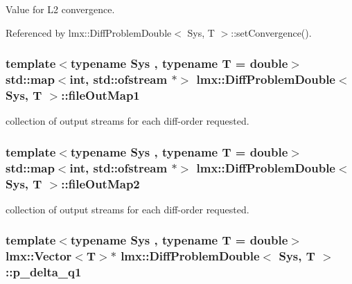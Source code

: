 Value for L2 convergence. 



Referenced by lmx\-::\-Diff\-Problem\-Double$<$ Sys, T $>$\-::set\-Convergence().

\hypertarget{classlmx_1_1DiffProblemDouble_aa26e0b530cc5b78b32383515a7932a97}{
\subsubsection[{file\-Out\-Map1}]{\setlength{\rightskip}{0pt plus 5cm}template$<$typename Sys , typename T  = double$>$ std\-::map$<$int, std\-::ofstream $\ast$$>$ {\bf lmx\-::\-Diff\-Problem\-Double}$<$ Sys, T $>$\-::file\-Out\-Map1\hspace{0.3cm}{\ttfamily [protected]}}}\label{classlmx_1_1DiffProblemDouble_aa26e0b530cc5b78b32383515a7932a97}


collection of output streams for each diff-\/order requested. 

\hypertarget{classlmx_1_1DiffProblemDouble_a17946e26033b4dc383b37756b39097a5}{
\subsubsection[{file\-Out\-Map2}]{\setlength{\rightskip}{0pt plus 5cm}template$<$typename Sys , typename T  = double$>$ std\-::map$<$int, std\-::ofstream $\ast$$>$ {\bf lmx\-::\-Diff\-Problem\-Double}$<$ Sys, T $>$\-::file\-Out\-Map2\hspace{0.3cm}{\ttfamily [protected]}}}\label{classlmx_1_1DiffProblemDouble_a17946e26033b4dc383b37756b39097a5}


collection of output streams for each diff-\/order requested. 

\hypertarget{classlmx_1_1DiffProblemDouble_ad460462bffa8b3425e0e2df46d6bcf63}{
\subsubsection[{p\-\_\-delta\-\_\-q1}]{\setlength{\rightskip}{0pt plus 5cm}template$<$typename Sys , typename T  = double$>$ {\bf lmx\-::\-Vector}$<$T$>$$\ast$ {\bf lmx\-::\-Diff\-Problem\-Double}$<$ Sys, T $>$\-::p\-\_\-delta\-\_\-q1\hspace{0.3cm}{\ttfamily [protected]}}}\label{classlmx_1_1DiffProblemDouble_ad460462bffa8b3425e0e2df46d6bcf63}


